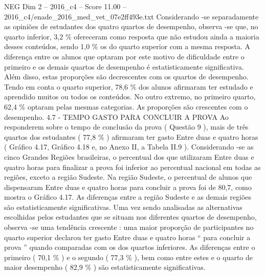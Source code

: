 \begin{textsample}{NEG Dim 2 – 2016\_c4 – Score 11.00 – 2016\_c4/enade\_2016\_med\_vet\_07e2ff493e.txt}
Considerando -se separadamente as opiniões de estudantes dos quatro quartos de desempenho, observa -se que, no quarto inferior, 3,2 \% ofereceram como resposta que não estudou ainda a maioria desses conteúdos, sendo 1,0 \% os do quarto superior com a mesma resposta.
A diferença entre os alunos que optaram por este motivo de dificuldade entre o primeiro e os demais quartos de desempenho é estatisticamente significativa.
Além disso, estas proporções são decrescentes com os quartos de desempenho.
Tendo em conta o quarto superior, 78,6 \% dos alunos afirmaram ter estudado e aprendido muitos ou todos os conteúdos.
No outro extremo, no primeiro quarto, 62,4 \% optaram pelas mesmas categorias.
As proporções são crescentes com o desempenho. 4.7 - TEMPO GASTO PARA CONCLUIR A PROVA Ao responderem sobre o tempo de conclusão da prova ( Questão 9 ), mais de três quartos dos estudantes ( 77,8 \% ) afirmaram ter gasto Entre duas e quatro horas ( Gráfico 4.17, Gráfico 4.18 e, no Anexo II, a Tabela II.9 ).
Considerando -se as cinco Grandes Regiões brasileiras, o percentual dos que utilizaram Entre duas e quatro horas para finalizar a prova foi inferior ao percentual nacional em todas as regiões, exceto a região Sudeste.
Na região Sudeste, o percentual de alunos que dispensaram Entre duas e quatro horas para concluir a prova foi de 80,7, como mostra o Gráfico 4.17.
As diferenças entre a região Sudeste e as demais regiões são estatisticamente significativas.
Uma vez sendo analisadas as alternativas escolhidas pelos estudantes que se situam nos diferentes quartos de desempenho, observa -se uma tendência crescente : uma maior proporção de participantes no quarto superior declarou ter gasto Entre duas e quatro horas “ para concluir a prova ” quando comparadas com os dos quartos inferiores.
As diferenças entre o primeiro ( 70,1 \% ) e o segundo ( 77,3 \% ), bem como entre estes e o quarto de maior desempenho ( 82,9 \% ) são estatisticamente significativas.

\end{textsample}
